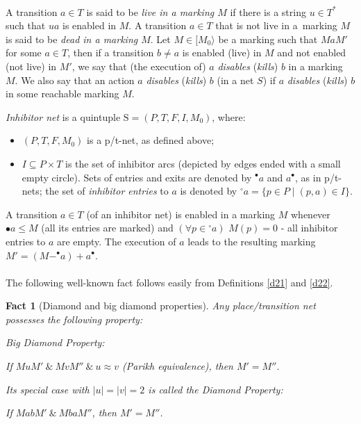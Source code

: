 \documentclass[a4paper]{llncs}
\newtheorem{fact}{Fact}
\begin{document}
\mbox{ }\\
A transition $a \in T$ is said to be \emph{live in a marking $M$} if there is a string $u\in T^*$ such that $ua$ is enabled in $M$. A transition $a \in T$ that is not live in a~marking $M$ is said to be \emph{dead in a marking $M$}. Let $M \in [M_0\rangle$ be a marking such that $MaM'$ for some $a\in T$, then if a transition $b \neq a$ is enabled (live) in $M$ and not enabled (not live) in $M'$, we say that (the execution of) $a$ \emph{disables} (\emph{kills}) $b$ in a marking $M$. We also say that an action $a$  \emph{disables} (\emph{kills}) $b$ (in a net $S$) if $a$ \emph{disables} (\emph{kills}) $b$ in some reachable marking $M$.
\\ 
\begin{definition} 
\label{d23}
\emph{Inhibitor net}  is a quintuple $\mathrm{S} = (P,T,F,I,M_0)$, where:
\begin{itemize}
\item $(P,T,F,M_0)$ is a p/t-net, as defined above;
\item $I\subseteq P\times T$ is the set of inhibitor arcs (depicted by edges ended with a small empty circle). Sets of entries and exits are denoted by $^\bullet a$ and $a^\bullet$, as in p/t-nets; the set of \emph{inhibitor entries} to $a$ is denoted by $^\circ a=\{p\in P \mid (p,a)\in I\}$.
\end{itemize}
\end{definition}
A transition $a \in T$ (of an inhibitor net) is enabled in a marking $M$ whenever $\bullet a\leq M$ (all its entries are marked) and $(\forall p\in{ ^\circ a})$ $M(p)= 0$ - all inhibitor entries to $a$ are empty. The execution of $a$ leads to the resulting marking $M'= (M-^\bullet a)+a^\bullet$.
\\ \\
The following well-known fact follows easily from Definitions \ref{d21} and \ref{d22}.
\begin{fact} [Diamond and big diamond properties]
\label{f24}
Any place/transition net possesses the following property:

\emph{Big Diamond Property}:

If $MuM' \ \& \ MvM'' \ \& \ u\approx v$ (Parikh equivalence), then $M' =M''$.

Its special case with $|u|=|v|=2$ is called the \emph{Diamond Property}:

If $MabM'\ \& \ MbaM''$, then $M' =M''$.
\end{fact}
\end{document}
